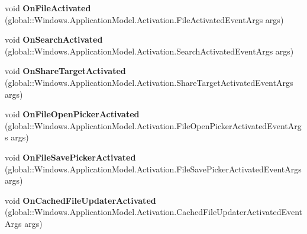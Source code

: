 \begin{DoxyCompactItemize}
\mbox{\label{interface_windows_1_1_u_i_1_1_xaml_1_1_i_application_overrides_a9e67cc475338afb3d85b18949e08b15f}} 
void {\bfseries On\+File\+Activated} (global\+::\+Windows.\+Application\+Model.\+Activation.\+File\+Activated\+Event\+Args args)
\item 
\mbox{\label{interface_windows_1_1_u_i_1_1_xaml_1_1_i_application_overrides_aa8ed1fee4ec2b422d17e20f81f1d7c31}} 
void {\bfseries On\+Search\+Activated} (global\+::\+Windows.\+Application\+Model.\+Activation.\+Search\+Activated\+Event\+Args args)
\item 
\mbox{\label{interface_windows_1_1_u_i_1_1_xaml_1_1_i_application_overrides_aae46c198cf7ea67cfcbf175e03b9c9d6}} 
void {\bfseries On\+Share\+Target\+Activated} (global\+::\+Windows.\+Application\+Model.\+Activation.\+Share\+Target\+Activated\+Event\+Args args)
\item 
\mbox{\label{interface_windows_1_1_u_i_1_1_xaml_1_1_i_application_overrides_a9936f8d6d560846bd8afcc2caf52f817}} 
void {\bfseries On\+File\+Open\+Picker\+Activated} (global\+::\+Windows.\+Application\+Model.\+Activation.\+File\+Open\+Picker\+Activated\+Event\+Args args)
\item 
\mbox{\label{interface_windows_1_1_u_i_1_1_xaml_1_1_i_application_overrides_ac1045282cb352835c663f00f47f545c0}} 
void {\bfseries On\+File\+Save\+Picker\+Activated} (global\+::\+Windows.\+Application\+Model.\+Activation.\+File\+Save\+Picker\+Activated\+Event\+Args args)
\item 
\mbox{\label{interface_windows_1_1_u_i_1_1_xaml_1_1_i_application_overrides_ae742ea61ef4a57a981967d42b9269009}} 
void {\bfseries On\+Cached\+File\+Updater\+Activated} (global\+::\+Windows.\+Application\+Model.\+Activation.\+Cached\+File\+Updater\+Activated\+Event\+Args args)
\item 
\mbox{\label{interface_windows_1_1_u_i_1_1_xaml_1_1_i_application_overrides_ae5c60a74b6070b8b620b11c15d8a0d1e}} 

\end{DoxyCompactItemize}

